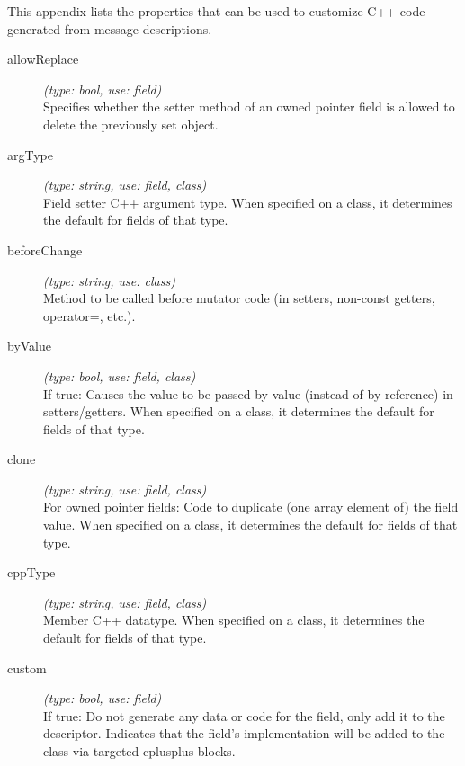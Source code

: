 \label{cha:msg-properties}

This appendix lists the properties that can be used to customize C++ code
generated from message descriptions.

%
%
\begin{description}
\item[allowReplace] \textit{(type: bool, use: field)} \\
    Specifies whether the setter method of an owned pointer field is allowed to
    delete the previously set object.

\item[argType] \textit{(type: string, use: field, class)} \\
    Field setter C++ argument type. When specified on a class, it determines the
    default for fields of that type.

\item[beforeChange] \textit{(type: string, use: class)} \\
    Method to be called before mutator code (in setters, non-const getters,
    operator=, etc.).

\item[byValue] \textit{(type: bool, use: field, class)} \\
    If true: Causes the value to be passed by value (instead of by reference) in
    setters/getters. When specified on a class, it determines the default for
    fields of that type.

\item[clone] \textit{(type: string, use: field, class)} \\
    For owned pointer fields: Code to duplicate (one array element of) the field
    value. When specified on a class, it determines the default for fields of
    that type.

\item[cppType] \textit{(type: string, use: field, class)} \\
    Member C++ datatype. When specified on a class, it determines the default
    for fields of that type.

\item[custom] \textit{(type: bool, use: field)} \\
    If true: Do not generate any data or code for the field, only add it to the
    descriptor. Indicates that the field's implementation will be added to the
    class via targeted cplusplus blocks.


\end{description}
